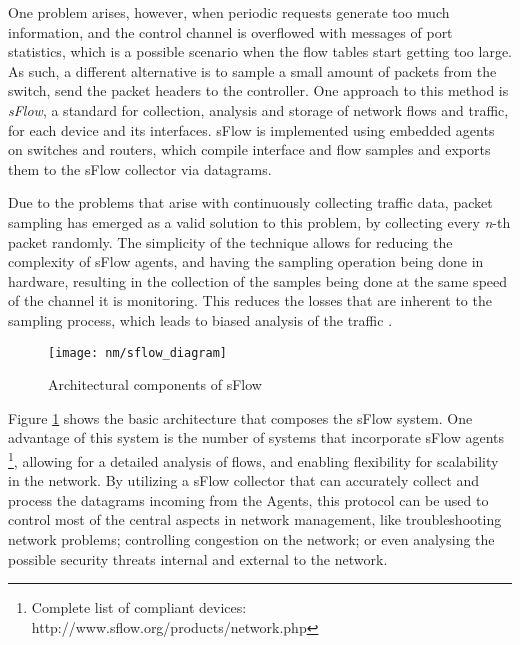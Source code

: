 One problem arises, however, when periodic requests generate too much information, and the control channel is overflowed with messages of port statistics, which is a possible scenario when the
flow tables start getting too large. As such, a different alternative is to sample a small amount of packets from the switch, send the packet headers to the controller. One approach to this method is \textit{sFlow}, 
a standard for collection, analysis and storage of network flows and traffic, for each device and its interfaces. sFlow is implemented using embedded agents on switches and routers, which compile interface and flow samples and 
exports them to the sFlow collector via datagrams. 
\par Due to the problems that arise with continuously collecting traffic data, packet sampling has emerged as a valid solution to this problem, by collecting every \textit{n}-th packet randomly. The simplicity of the 
technique allows for reducing the complexity of sFlow agents, and having the sampling operation being done in hardware, resulting in the collection of the samples being done at the same speed of the channel it is monitoring. This
reduces the losses that are inherent to the sampling process, which leads to biased analysis of the traffic \cite {CITE - packet_sample_anomaly}.

\begin{figure} [!htbp]
    \centering
    \texttt{[image: nm/sflow\_diagram]}
    \caption{Architectural components of sFlow}
    \label{fig:sflow}
\end{figure}

\par Figure \ref{fig:sflow} shows the basic architecture that composes the sFlow system. One advantage of this system is the number of systems that incorporate sFlow agents \footnote {Complete list of compliant devices: 
http://www.sflow.org/products/network.php}, allowing for a detailed analysis of flows, and enabling flexibility for scalability in the network. By utilizing a sFlow collector that can accurately collect and process the datagrams 
incoming from the Agents, this protocol can be used to control most of the central aspects in network management, like troubleshooting network problems; controlling congestion on the network; or even analysing the possible 
security threats internal and external to the network.
